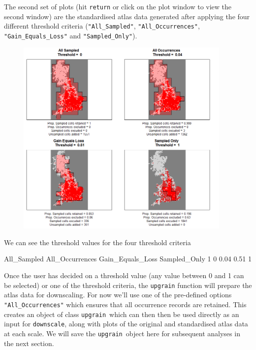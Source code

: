 \documentclass{article}[12pt, a4paper]
\begin{document}
The second set of plots (hit \texttt{return} or click on the plot window to view the second window) are the standardised atlas data generated after applying the four different threshold criteria (\texttt{"All\_Sampled"},  \texttt{"All\_Occurrences"},  \texttt{"Gain\_Equals\_Loss"} and \texttt{"Sampled\_Only"}).

\begin{figure}[!h]
\centering
\includegraphics[width=10.5cm]{Threshold_maps.png}
\end{figure}

We can see the threshold values for the four threshold criteria

\begin{Schunk}
\begin{Soutput}
  All_Sampled All_Occurrences Gain_Equals_Loss Sampled_Only
1           0            0.04             0.51            1
\end{Soutput}
\end{Schunk}

Once the user has decided on a threshold value (any value between 0 and 1 can be selected) or one of the threshold criteria, the \texttt{upgrain} function will prepare the atlas data for downscaling. For now we’ll use one of the pre-defined options \texttt{"All\_Occurrences"} which ensures that all occurrence records are retained. This creates an object of class \textquotesingle \texttt{upgrain}\textquotesingle\ which can then then be used directly as an input for \texttt{downscale}, along with plots of the original and standardised atlas data at each scale. We will save the \textquotesingle \texttt{upgrain}\textquotesingle\ object here for subsequent analyses in the next section.
\end{document}
